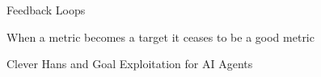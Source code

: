 \begin{vbframe}{Feedback Loops}
\end{vbframe}

\begin{vbframe}{When a metric becomes a target it ceases to be a good metric}


\end{vbframe}

\begin{vbframe}{Clever Hans and Goal Exploitation for AI Agents}


\end{vbframe}
\endlecture

